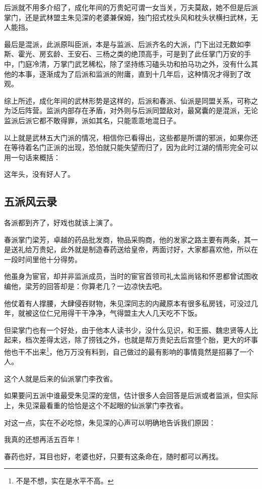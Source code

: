\begin{multicols}{\theparacolNo}
		后派就不用多介绍了，成化年间的万贵妃可谓一女当关，万夫莫敌，她不但是后派掌门，还是武林盟主朱见深的老婆兼保姆，独门招式枕头风和枕头状横扫武林，无人能挡。

		最后是混派，此派原叫臣派，本是与监派、后派齐名的大派，门下出过无数如李斯、霍光、房玄龄、王安石、三杨之类的绝顶高手，可是到了此任掌门万安的手中，门庭冷清，万掌门武艺稀松，除了坚持练习磕头功和拍马功之外，没有什么其他的本事，逐渐成为了后派和监派的附庸，直到十几年后，这种情况才得到了改观。

		综上所述，成化年间的武林形势是这样的，后派和春派、仙派是同盟关系，可称之为泛后阵营。监派内部存在矛盾，对外则与后派同盟敌对，最窝囊的是混派，无论监派后派它都不敢得罪，派如其名，只能乖乖地混日子。

		以上就是武林五大门派的情况，相信你已看得出，这些都是所谓的邪派，如果你还在等待着名门正派的出现，恐怕就只能失望而归了，因为此时江湖的情形完全可以用一句话来概括：

		这年头，没有好人了。

		\subsection{五派风云录}
		各派都到齐了，好戏也就该上演了。

		春派掌门梁芳，卓越的药品批发商，物品采购商，他的发家之路主要有两条，其一是送礼给万贵妃，此外就是制造春药送给皇帝，两面讨好，大家都喜欢他，所以在一段时间里他十分得势。

		他虽身为宦官，却并非监派成员，当时的宦官首领司礼太监尚铭和怀恩都曾试图收编他，梁芳的回答却是：你算老几？一边凉快去吧。

		他仗着有人撑腰，大肆侵吞财物，朱见深同志的内藏原本有很多私房钱，可没过几年，就被这位仁兄用得干干净净，气得盟主大人几天吃不下饭。

		但梁掌门也有一个好处，由于他本人读书少，没什么见识，和王振、魏忠贤等人比起来，档次差得太远，除了捞钱之外，也就是帮万贵妃去后宫堕个胎，更大的坏事他也干不出来\footnote{不是不想，实在是水平不高。}，他万万没有料到，自己做过的最有影响的事情竟然是招募了一个人。

		这个人就是后来的仙派掌门李孜省。

		如果要问五派中谁最受朱见深的宠信，估计很多人会回答是后派或者监派，但实际上，朱见深最看重的恰恰是这个不起眼的仙派掌门李孜省。

		对这一点，实在不必吃惊，朱见深的心声可以明确地告诉我们原因：

		我真的还想再活五百年！

		春药也好，耳目也好，老婆也好，只要有这条命在，随时都可以再找。


\end{multicols}
